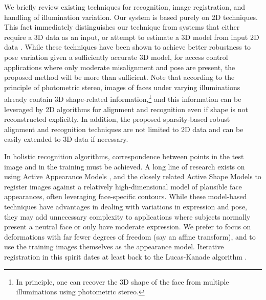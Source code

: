 \documentclass[12pt,journal,draftcls,letterpaper,onecolumn]{IEEEtran}
\begin{document}
We briefly review existing techniques for recognition, image registration, and
handling of illumination variation.  Our system is based purely on 2D
techniques.  This fact immediately distinguishes our technique from systems
that either require a 3D data as an input, or attempt to estimate a 3D model
from input 2D data \cite{amberg2007reconstructing,Blanz2003-PAMI}.  While these
techniques have been shown to achieve better robustness to pose variation given
a sufficiently accurate 3D model, for access control applications where only 
moderate misalignment and pose are present, the proposed method will be more
than sufficient.   Note that according to the principle of photometric stereo, images of faces
under varying illuminations already contain 3D shape-related information,\footnote{In principle,
one can recover the 3D shape of the face from multiple illuminations using photometric stereo.} 
and this information can be leveraged by 2D algorithms for alignment and recognition 
even if shape is not reconstructed explicitly. In addition, the proposed sparsity-based robust
alignment and recognition techniques are not limited to 2D data and can be easily extended
to 3D data if necessary. 

In holistic recognition algorithms, correspondence between points in the test
image and in the training must be achieved.  A long line of research exists on
using Active Appearance Models \cite{Cootes2001-PAMI}, and the closely related
Active Shape Models \cite{cootes1992active} to register images against a
relatively high-dimensional model of plausible face appearances, often
leveraging face-specific contours.  While these model-based techniques have
advantages in dealing with variations in expression and pose, they may add
unnecessary complexity to applications where subjects normally present a neutral face
or only have moderate expression. We prefer to focus on deformations with far fewer 
degrees of freedom (say an affine transform), and to use the training images themselves 
as the appearance model. Iterative registration in this spirit dates at least back to the 
Lucas-Kanade algorithm \cite{lucas1981iterative}.
\end{document}
